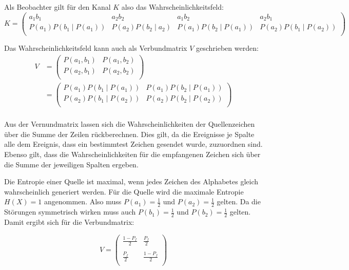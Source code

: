 Als Beobachter gilt für den Kanal $K$ also das Wahrscheinlichkeitsfeld:
$$
	K = 
	\left(
	\begin{array}{*{4}{c}}
		a_1b_1                          & a_2b_2           & a_1b_2                    & a_2b_1 \\
		P(a_1) P(b_1 \mid P(a_1)) & P(a_2) P(b_2 \mid a_2) & P(a_1) P(b_2 \mid P(a_1)) & P(a_2) P(b_1 \mid P(a_2)) \\
	\end{array}
	\right)
$$


Das Wahrscheinlichkeitsfeld kann auch als Verbundmatrix $V$ geschrieben werden:
\begin{align*}
	V &= \left(
	     \begin{array}{*{2}{c}}
	     	P(a_1,b_1) & P(a_1,b_2) \\
	     	P(a_2,b_1) & P(a_2,b_2) \\
	     \end{array}
	     \right) \\
	  &= \left(
	     \begin{array}{*{2}{c}}
	     	P(a_1) P(b_1 \mid P(a_1)) & P(a_1) P(b_2 \mid P(a_1)) \\
	     	P(a_2) P(b_1 \mid P(a_2)) & P(a_2) P(b_2 \mid P(a_2)) \\
	     \end{array}
	     \right) \\
\end{align*}

Aus der Vernundmatrix lassen sich die Wahrscheinlichkeiten der Quellenzeichen über die Summe der Zeilen rückberechnen. Dies gilt, da die Ereignisse je Spalte alle dem Ereignis, dass ein bestimmtest Zeichen gesendet wurde, zuzuordnen sind. Ebenso gilt, dass die Wahrscheinlichkeiten für die empfangenen Zeichen sich über die Summe der jeweiligen Spalten ergeben.

Die Entropie einer Quelle ist maximal, wenn jedes Zeichen des Alphabetes gleich wahrscheinlich generiert werden. Für die Quelle wird die maximale Entropie $H(X) = 1$ angenommen. Also muss $P(a_1) = \frac{1}{2}$ und $P(a_2) = \frac{1}{2}$ gelten. Da die Störungen symmetrisch wirken muss auch $P(b_1) = \frac{1}{2}$ und $P(b_2) = \frac{1}{2}$ gelten. Damit ergibt sich für die Verbundmatrix:

$$
V = 
\left(
\begin{array}{*{2}{c}}
 	\frac{1-P_f}{2} & \frac{P_f}{2} \\
 	\\
 	\frac{P_f}{2}   & \frac{1-P_f}{2} \\
\end{array}
\right)
$$


